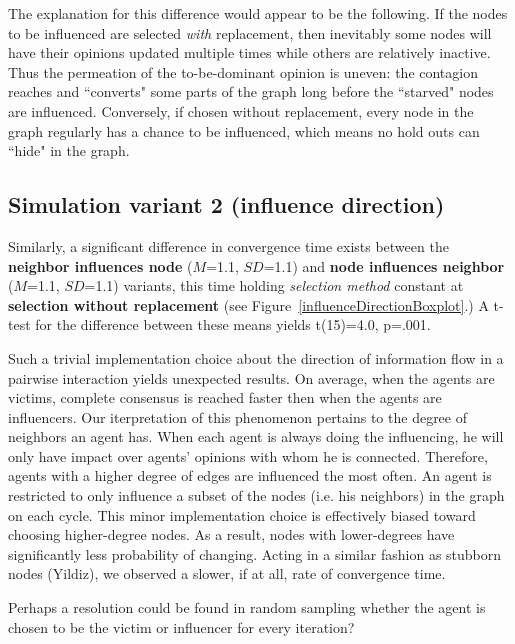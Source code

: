 The explanation for this difference would appear to be the following. If the
nodes to be influenced are selected \textit{with} replacement, then inevitably
some nodes will have their opinions updated multiple times while others are
relatively inactive. Thus the permeation of the to-be-dominant opinion is
uneven: the contagion reaches and ``converts" some parts of the graph long
before the ``starved" nodes are influenced. Conversely, if chosen without
replacement, every node in the graph regularly has a chance to be influenced,
which means no hold outs can ``hide" in the graph.





\subsection{Simulation variant 2 (influence direction)}

Similarly, a significant difference in convergence time exists between the
\textbf{neighbor influences node} ($M$=1.1, $SD$=1.1) and \textbf{node
influences neighbor} ($M$=1.1, $SD$=1.1) variants, this time holding
\textsl{selection method} constant at \textbf{selection without replacement}
(see Figure~\ref{influenceDirectionBoxplot}.) A t-test for the difference
between these means yields t(15)=4.0, p=.001.

Such a trivial implementation choice about the direction of information flow 
in a pairwise interaction yields unexpected results. On average, when the 
agents are victims, complete consensus is reached faster then when the agents
are influencers. Our iterpretation of this phenomenon pertains to the degree
of neighbors an agent has. When each agent is always doing the influencing, 
he will only have impact over agents' opinions with whom he is connected. 
Therefore, agents with a higher degree of edges are influenced the most
often. An agent is restricted to only influence a subset of the nodes
(i.e. his neighbors) in the graph on each cycle. This minor implementation
choice is effectively biased toward choosing higher-degree nodes. As a result,
nodes with lower-degrees have significantly less probability of changing. 
Acting in a similar fashion as stubborn nodes (Yildiz), we observed a slower, 
if at all, rate of convergence time.

Perhaps a resolution could be found in random sampling whether the agent is chosen 
to be the victim or influencer for every iteration?



